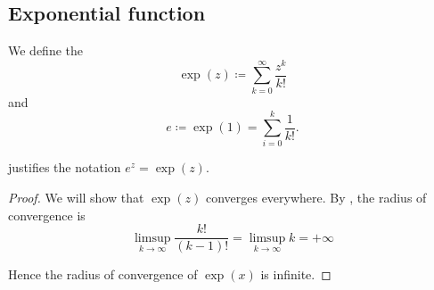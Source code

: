 \subsection{Exponential function}\label{subsec:exponential_function}

\begin{Definition}\label{def:exponential_function}
  We define the 
  \begin{equation}\label{def:exponential_function/series}
    \exp(z) \coloneqq \sum_{k=0}^\infty \frac {z^k} {k!}
  \end{equation}
  and 
  \begin{equation*}
    e \coloneqq \exp(1) = \sum_{i=0}^k \frac 1 {k!}.
  \end{equation*}

   justifies the notation \( e^z = \exp(z) \).
\end{Definition}
\begin{proof}
  We will show that \( \exp(z) \) converges everywhere. By , the radius of convergence is
  \begin{equation*}
    \limsup_{k \to \infty} \frac {k!} {(k-1)!}
    =
    \limsup_{k \to \infty} k
    =
    +\infty
  \end{equation*}

  Hence the radius of convergence of \( \exp(x) \) is infinite.
\end{proof}

